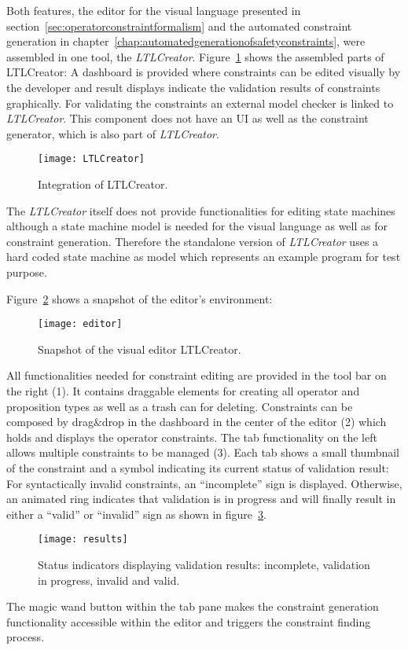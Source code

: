 Both features, the editor for the visual language presented in section~\ref{sec:operatorconstraintformalism} and the automated constraint generation in chapter~\ref{chap:automatedgenerationofsafetyconstraints}, were assembled in one tool, the \emph{LTLCreator}.
Figure~\ref{fig:LTLCreator} shows the assembled parts of LTLCreator: A dashboard is provided where constraints can be edited visually by the developer and result displays indicate the validation results of constraints graphically. For validating the constraints an external model checker is linked to \emph{LTLCreator}. This component does not have an UI as well as the constraint generator, which is also part of \emph{LTLCreator}. 
\begin{figure}[htbp]
  \centering
  \texttt{[image: LTLCreator]}
  \caption{Integration of LTLCreator.}
  \label{fig:LTLCreator}
\end{figure}
The \emph{LTLCreator} itself does not provide functionalities for editing state machines although a state machine model is needed for the visual language as well as for constraint generation. Therefore the standalone version of \emph{LTLCreator} uses a hard coded state machine as model which represents an example program for test purpose.

Figure~\ref{fig:editor} shows a snapshot of the editor's environment:
\begin{figure}[htbp]
  \centering
  \texttt{[image: editor]} 
  \caption{Snapshot of the visual editor LTLCreator.}
  \label{fig:editor}
\end{figure}
All functionalities needed for constraint editing are provided in the tool bar on the right (1). It contains draggable elements for creating all operator and proposition types as well as a trash can for deleting. Constraints can be composed by drag\&drop in the dashboard in the center of the editor (2) which holds and displays the operator constraints. The tab functionality on the left allows multiple constraints to be managed (3). Each tab shows a small thumbnail of the constraint and a symbol indicating its current status of validation result: For syntactically invalid constraints, an ``incomplete'' sign is displayed. Otherwise, an animated ring indicates that validation is in pro\-gress and will finally result in either a ``valid'' or ``invalid'' sign as shown in figure~\ref{fig:results}.
\begin{figure}[htbp]
  \centering
  \texttt{[image: results]}
  \caption{Status indicators displaying validation results: incomplete, validation in pro\-gress, invalid and valid.}
  \label{fig:results}
\end{figure}
The magic wand button within the tab pane makes the constraint generation functionality accessible within the editor and triggers the constraint finding process.



